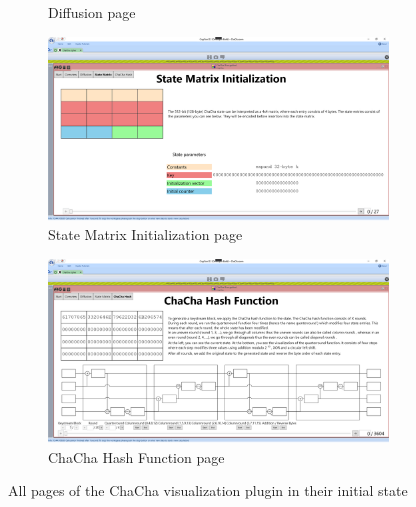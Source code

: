 \begin{figure}
\begin{subfigure}{.5\textwidth}
  \caption{Diffusion page}
\end{subfigure}%
\begin{subfigure}{.5\textwidth}
  \centering
  \includegraphics[width=0.99\textwidth]{figures/ct2/all-pages/4-statematrix.png}
  \caption{State Matrix Initialization page}
\end{subfigure}
\begin{subfigure}{.5\textwidth}
  \centering
  \includegraphics[width=0.99\textwidth]{figures/ct2/all-pages/5-chachahash.png}
  \caption{ChaCha Hash Function page}
\end{subfigure}
\caption[All pages of the ChaCha visualization plugin]{All pages of the ChaCha visualization plugin in their initial state}
\label{fig:allpages}
\end{figure}

